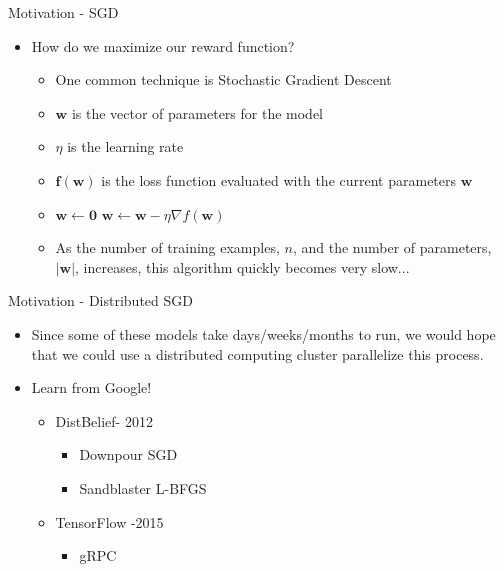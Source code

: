 \documentclass{beamer}
\begin{document}
\begin{frame}{Motivation - SGD}
\begin{itemize}
\item How do we maximize our reward function?
\begin{itemize}
\item One common technique is Stochastic Gradient Descent
\item $\mathbf w$ is the vector of parameters for the model
\item $\eta$ is the learning rate 
\item $\mathbf f(\mathbf w)$ is the loss function evaluated with the current parameters $\mathbf w$
\item 
\begin{algorithmic}
\State $\mathbf w \gets \mathbf 0$
    \State $\mathbf w \gets \mathbf w - \eta\nabla f(\mathbf w)$
	\EndFor
\EndWhile

\end{algorithmic}
\item As the number of training examples, $n$, and the number of parameters, $|\mathbf w|$, increases, this algorithm quickly becomes very slow...
\end{itemize}
\end{itemize}
\end{frame}

\begin{frame}{Motivation - Distributed SGD}
\begin{itemize}
\item Since some of these models take days/weeks/months to run, we would hope that we could use a distributed computing cluster parallelize this process.
\pause
\item Learn from Google!
\begin{itemize}
\item DistBelief- 2012
\begin{itemize}
\item Downpour SGD
\item Sandblaster L-BFGS
\end{itemize}
\item TensorFlow -2015
\begin{itemize}
\item gRPC
\end{itemize}
\end{itemize}
\end{itemize}

\end{frame}
\end{document}
